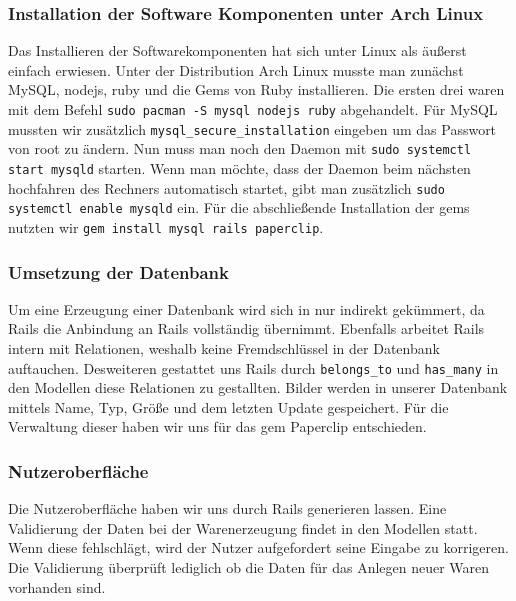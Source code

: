 \documentclass[pdftex,10pt,a4paper]{article}
\begin{document}
\subsubsection{Installation der Software Komponenten unter Arch Linux}
Das Installieren der Softwarekomponenten hat sich unter Linux als \"au{\ss}erst einfach erwiesen. Unter der Distribution Arch Linux musste man zun\"achst MySQL, nodejs, ruby und die Gems von Ruby installieren. Die ersten drei waren mit dem Befehl \texttt{sudo pacman -S mysql nodejs ruby} abgehandelt. F\"ur MySQL mussten wir  zus\"atzlich \texttt{mysql\_secure\_installation} eingeben um das Passwort von root zu \"andern. Nun muss man noch den Daemon mit \texttt{sudo systemctl start mysqld} starten. Wenn man m\"ochte, dass der Daemon beim n\"achsten hochfahren des Rechners automatisch startet, gibt man zus\"atzlich \texttt{sudo systemctl enable mysqld} ein. F\"ur die abschlie{\ss}ende Installation der gems nutzten wir \texttt{gem install mysql rails paperclip}. 

\subsubsection{Umsetzung der Datenbank}
Um eine Erzeugung einer Datenbank wird sich in nur indirekt gek\"ummert, da Rails die Anbindung an Rails vollst\"andig \"ubernimmt. Ebenfalls arbeitet Rails intern mit Relationen, weshalb keine Fremdschl\"ussel in der Datenbank auftauchen. Desweiteren gestattet uns Rails durch \texttt{belongs\_to} und \texttt{has\_many} in den Modellen diese Relationen zu gestallten. Bilder werden in unserer Datenbank mittels Name, Typ, Gr\"o{\ss}e und dem letzten Update gespeichert. F\"ur die Verwaltung dieser haben wir uns f\"ur das gem Paperclip entschieden. 

\subsubsection{Nutzeroberfl\"ache}
Die Nutzeroberfl\"ache haben wir uns durch Rails generieren lassen. Eine Validierung der Daten bei der Warenerzeugung findet in den Modellen statt. Wenn diese fehlschl\"agt, wird der Nutzer aufgefordert seine Eingabe zu korrigeren. Die Validierung \"uberpr\"uft lediglich ob die Daten f\"ur das Anlegen neuer Waren vorhanden sind.  



\end{document}
